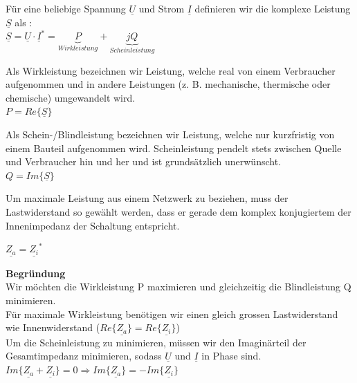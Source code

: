 \beginip
Für eine beliebige Spannung $\underline{U}$ und  Strom $\underline{I}$ definieren wir die komplexe Leistung $\underline{S}$ als : \\
\formulaBegin
$ \underline{S} = \underline{U} \cdot \underline{I}^* = \underbrace{P}_{Wirkleistung} + \underbrace{jQ}_{Scheinleistung}$
\formulaEnd
\iend

\beginip
Als Wirkleistung bezeichnen wir Leistung, welche real von einem Verbraucher aufgenommen und in andere Leistungen (z. B. mechanische, thermische oder chemische) umgewandelt wird. \\
\formulaBegin
$P = Re\{\underline{S}\}$
\formulaEnd
\iend


\beginip
Als Schein-/Blindleistung bezeichnen wir Leistung, welche nur kurzfristig von einem Bauteil aufgenommen wird. Scheinleistung pendelt stets zwischen Quelle und Verbraucher hin und her und ist grundsätzlich unerwünscht. \\
\formulaBegin
$Q = Im\{\underline{S}\}$
\formulaEnd
\iend

\beginip
Um maximale Leistung aus einem Netzwerk zu beziehen, muss der Lastwiderstand so gewählt werden, dass er gerade dem komplex konjugiertem der Innenimpedanz der Schaltung entspricht. \\
\begin{center}
	\fix \fix \fix
\end{center}
\formulaBegin
$\underline{Z_a} = \underline{Z_i}^*$
\formulaEnd
\iend

\textbf{Begründung} \\
Wir möchten die Wirkleistung P maximieren und gleichzeitig die Blindleistung Q minimieren. \\
Für maximale Wirkleistung benötigen wir einen gleich grossen Lastwiderstand wie Innenwiderstand ($Re\{\underline{Z_a}\} = Re\{\underline{Z_i}\}$) \\
Um die Scheinleistung zu minimieren, müssen wir den Imaginärteil der Gesamtimpedanz minimieren, sodass $\underline{U}$ und $ \underline{I}$ in Phase sind. \\
$Im\{\underline{Z_a} +\underline{Z_i}\} = 0 \Rightarrow Im\{\underline{Z_a}\} = -Im\{\underline{Z_i}\}$


